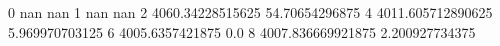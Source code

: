 0 nan nan
1 nan nan
2 4060.34228515625 54.70654296875
4 4011.605712890625 5.969970703125
6 4005.6357421875 0.0
8 4007.836669921875 2.200927734375
